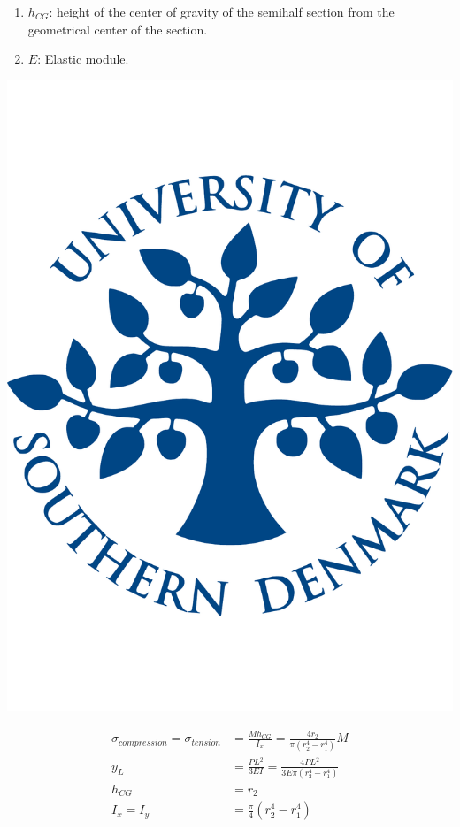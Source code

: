   \begin{enumerate}
    \item $h_{CG}$: height of the center of gravity of the semihalf section from the geometrical center of the section.

    \item $E$: Elastic module.
  \end{enumerate}


  \noindent\begin{minipage}{0.2\textwidth}%
      \includegraphics[width=\linewidth]{figures/sdu_logo.pdf}
  \end{minipage}%
  \hfill%
  \begin{minipage}{0.8\textwidth}
    \begin{equation}
      \begin{aligned}
      \sigma _{compression} = \sigma _{tension} &= \frac{M h_{CG}}{I_x} = \frac{4 r_2}{\pi(r_2 ^4 - r_1 ^4)} M \\
      y_L &= \frac{P L^2}{3EI} = \frac{4 P L^2}{3 E \pi(r_2 ^4 - r_1 ^4)}\\
      h_{CG} &= r_2 \\
      I_x = I_y &= \frac{\pi}{4} (r_2 ^4 - r_1 ^4)
      \end{aligned}
    \end{equation}
  \end{minipage}

